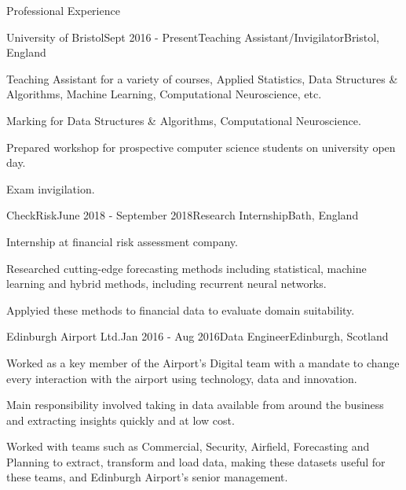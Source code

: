 \documentclass{resume} %
\begin{document}

\begin{rSection}{Professional Experience}

\begin{rSubsection}{University of Bristol}{Sept 2016 - Present}{Teaching Assistant/Invigilator}{Bristol, England}
\item Teaching Assistant for a variety of courses, Applied Statistics, Data Structures \& Algorithms, Machine Learning, Computational Neuroscience, etc.
\item Marking for Data Structures \& Algorithms, Computational Neuroscience.
\item Prepared workshop for prospective computer science students on university open day.
\item Exam invigilation.
\end{rSubsection}

\begin{rSubsection}{CheckRisk}{June 2018 - September 2018}{Research Internship}{Bath, England}
\item Internship at financial risk assessment company. 
\item Researched cutting-edge forecasting methods including statistical, machine learning and hybrid methods, including recurrent neural networks. 
\item Applyied these methods to financial data to evaluate domain suitability.
\end{rSubsection}

\begin{rSubsection}{Edinburgh Airport Ltd.}{Jan 2016 - Aug 2016}{Data Engineer}{Edinburgh, Scotland}
\item Worked as a key member of the Airport's Digital team with a mandate to change every interaction with the airport using technology, data and innovation.
\item Main responsibility involved taking in data available from around the business and extracting insights quickly and at low cost.
\item Worked with teams such as Commercial, Security, Airfield, Forecasting and Planning to extract, transform and load data, making these datasets useful for these teams, and Edinburgh Airport’s senior management.
\end{rSubsection}


\end{rSection}
\end{document}
